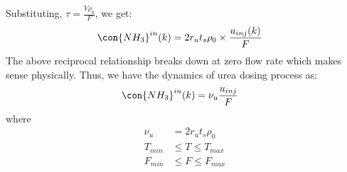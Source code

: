 Substituting, $\tau = \frac{V \rho_0}{F}$, we get:
\begin{align}
    \con{NH_3}^{in} (k) &= 2r_u t_s \rho_0 \times \frac{u_{inj}(k)}{F}
\end{align}
The above reciprocal relationship breaks down at zero flow rate which makes sense physically. Thus, we have the dynamics
of urea dosing process as:
\begin{align}
    \con{NH_3}^{in}(k) &= \nu_u \frac{u_{inj}}{F}    \label{eqn::urea_inj_dyn}
\end{align}
where
\begin{align*}
    \nu_u &= 2 r_u t_s \rho_0\\
    T_{min} &\leq T \leq T_{max}\\
    F_{min} &\leq F \leq F_{max}
\end{align*}
